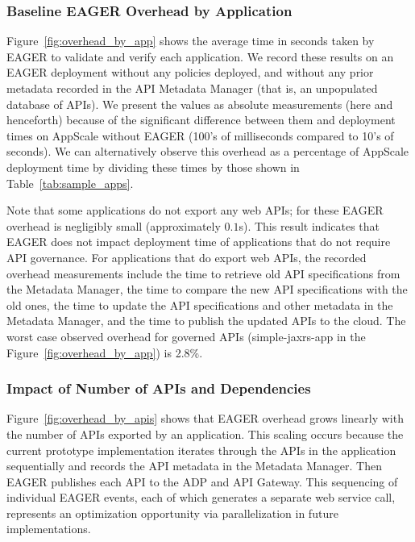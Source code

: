 \subsubsection{Baseline EAGER Overhead by Application}

Figure~\ref{fig:overhead_by_app} shows the average time in seconds taken by EAGER to validate and 
verify each application.  We record these results on an EAGER deployment without any policies 
deployed, and without any prior metadata recorded in the API Metadata Manager 
(that is, an unpopulated database of APIs).
We present the values as absolute measurements (here and henceforth) because
of the significant difference between them and 
deployment times on AppScale without EAGER (100's of milliseconds compared to 10's of seconds).  
We can alternatively observe this overhead as a 
percentage of AppScale deployment time by dividing these times by 
those shown in Table~\ref{tab:sample_apps}.

Note that some applications do not export any web APIs;
for these EAGER overhead is negligibly small (approximately $0.1$s). 
This result indicates that EAGER does not impact deployment time of applications 
that do not require API governance.  For applications that do
export web APIs, the recorded overhead measurements include the time
to retrieve old API specifications from the Metadata Manager, the time 
to compare the new API specifications with the old ones, the time to
update the API specifications and other metadata in the Metadata Manager, and
the time to publish the updated APIs to the cloud.  
The worst case observed overhead for governed APIs (simple-jaxrs-app in the
Figure~\ref{fig:overhead_by_app}) is 2.8\%.

\subsubsection{Impact of Number of APIs and Dependencies}

Figure~\ref{fig:overhead_by_apis} shows that EAGER overhead grows linearly
with the number of APIs exported by an application.  This scaling occurs
because the current prototype implementation iterates through the APIs in the
application sequentially and records the API metadata in the Metadata Manager.
Then EAGER publishes each API to the ADP and API Gateway. This sequencing of
individual EAGER events, each of which generates a separate web service call,
represents an optimization opportunity via parallelization in future implementations.

